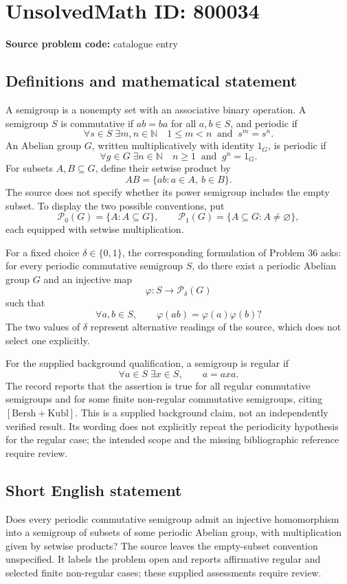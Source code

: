 \documentclass[11pt]{article}
\newcommand{\N}{\mathbb{N}}
\begin{document}
\section*{UnsolvedMath ID: 800034}
\textbf{Source problem code:} catalogue entry
\subsection{Definitions and mathematical statement}
A semigroup is a nonempty set with an associative binary operation. A semigroup \(S\) is commutative if \(ab=ba\) for all \(a,b\in S\), and periodic if
\[
\forall s\in S\;\exists m,n\in\N\quad 1\le m<n\ \text{ and }\ s^m=s^n.
\]
An Abelian group \(G\), written multiplicatively with identity \(1_G\), is periodic if
\[
\forall g\in G\;\exists n\in\N\quad n\ge1\ \text{ and }\ g^n=1_G.
\]
For subsets \(A,B\subseteq G\), define their setwise product by
\[
AB=\{ab:a\in A,\ b\in B\}.
\]
The source does not specify whether its power semigroup includes the empty subset. To display the two possible conventions, put
\[
\mathcal P_0(G)=\{A:A\subseteq G\},\qquad
\mathcal P_1(G)=\{A\subseteq G:A\ne\varnothing\},
\]
each equipped with setwise multiplication.

For a fixed choice \(\delta\in\{0,1\}\), the corresponding formulation of Problem 36 asks: for every periodic commutative semigroup \(S\), do there exist a periodic Abelian group \(G\) and an injective map
\[
\varphi:S\longrightarrow\mathcal P_\delta(G)
\]
such that
\[
\forall a,b\in S,\qquad \varphi(ab)=\varphi(a)\varphi(b)?
\]
The two values of \(\delta\) represent alternative readings of the source, which does not select one explicitly.

For the supplied background qualification, a semigroup is regular if
\[
\forall a\in S\;\exists x\in S,\qquad a=axa.
\]
The record reports that the assertion is true for all regular commutative semigroups and for some finite non-regular commutative semigroups, citing \([\mathrm{Bersh+Kubl}]\). This is a supplied background claim, not an independently verified result. Its wording does not explicitly repeat the periodicity hypothesis for the regular case; the intended scope and the missing bibliographic reference require review.
\subsection{Short English statement}
Does every periodic commutative semigroup admit an injective homomorphism into a semigroup of subsets of some periodic Abelian group, with multiplication given by setwise products? The source leaves the empty-subset convention unspecified. It labels the problem open and reports affirmative regular and selected finite non-regular cases; these supplied assessments require review.
\end{document}
